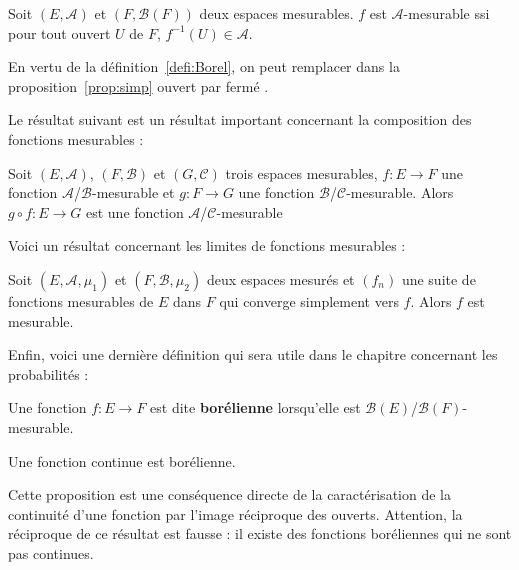 \documentclass[../integ-proba.tex]{subfiles}
\begin{document}
  \begin{prop}
    \label{prop:simp}
    Soit $\left(E, \mathcal{A}\right)$ et $\left(F, \mathcal{B}(F)\right)$ deux espaces mesurables.
    $f$ est $\mathcal{A}$-mesurable ssi pour tout ouvert $U$ de $F$, $f^{-1}(U) \in \mathcal{A}$.
  \end{prop}

  \begin{rem}
    En vertu de la définition~\ref{defi:Borel}, on peut remplacer dans la proposition~\ref{prop:simp} \og ouvert \fg par \og fermé \fg.
  \end{rem}

  Le résultat suivant est un résultat important concernant la composition des fonctions mesurables :

  \begin{prop}
    \label{prop:compmes}
    Soit $\left(E,\mathcal{A}\right)$, $\left(F,\mathcal{B}\right)$ et $\left(G,\mathcal{C}\right)$ trois espaces mesurables,
    $f : E \longrightarrow F$ une fonction $\mathcal{A}$/$\mathcal{B}$-mesurable et $g : F \longrightarrow G$ une fonction $\mathcal{B}$/$\mathcal{C}$-mesurable.
    Alors $g \circ f : E \longrightarrow G$ est une fonction $\mathcal{A}$/$\mathcal{C}$-mesurable
  \end{prop}

  Voici un résultat concernant les limites de fonctions mesurables :

  \begin{prop}
    \label{prop:limite_simple_mesurables}
    Soit $\left( E, \mathcal{A}, \mu_1 \right)$ et $\left( F, \mathcal{B}, \mu_2 \right)$ deux espaces mesurés et $\left( f_n \right)$ une suite de fonctions mesurables de $E$ dans $F$ qui converge simplement vers $f$.
    Alors $f$ est mesurable.
  \end{prop}

  Enfin, voici une dernière définition qui sera utile dans le chapitre concernant les probabilités :

  \begin{defi}
    Une fonction $f:E\longrightarrow F$ est dite \textbf{borélienne} lorsqu'elle est $\mathcal{B}(E)$/$\mathcal{B}(F)$-mesurable.
  \end{defi}

  \begin{prop}
    \label{prop:continue_implique_borelienne}
    Une fonction continue est borélienne.
  \end{prop}

  \begin{rem}
    Cette proposition est une conséquence directe de la caractérisation de la continuité d'une fonction par l'image réciproque des ouverts.
    Attention, la réciproque de ce résultat est fausse : il existe des fonctions boréliennes qui ne sont pas continues.
  \end{rem}
\end{document}
